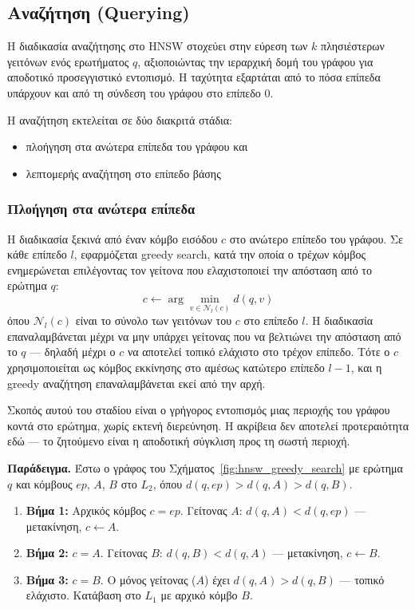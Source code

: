 \documentclass[12pt,a4paper]{article}
\begin{document}
\subsection{Αναζήτηση (Querying)}
Η διαδικασία αναζήτησης στο HNSW στοχεύει στην εύρεση των $k$ πλησιέστερων γειτόνων ενός ερωτήματος $q$, αξιοποιώντας την ιεραρχική δομή του γράφου για αποδοτικό προσεγγιστικό εντοπισμό. Η ταχύτητα εξαρτάται από το πόσα επίπεδα υπάρχουν και από τη σύνδεση του γράφου στο επίπεδο 0.

Η αναζήτηση εκτελείται σε δύο διακριτά στάδια:
\begin{itemize}
    \item πλοήγηση στα ανώτερα επίπεδα του γράφου και 
    \item λεπτομερής αναζήτηση στο επίπεδο βάσης
\end{itemize}

\subsubsection{Πλοήγηση στα ανώτερα επίπεδα}
Η διαδικασία ξεκινά από έναν κόμβο εισόδου $c$ στο ανώτερο επίπεδο του γράφου. Σε κάθε επίπεδο $l$, εφαρμόζεται greedy search, κατά την οποία ο τρέχων κόμβος ενημερώνεται επιλέγοντας τον γείτονα που ελαχιστοποιεί την απόσταση από το ερώτημα $q$:
\begin{equation}
    c \leftarrow \arg\min_{v \in \mathcal{N}_l(c)} d(q,v)
\end{equation}
όπου $\mathcal{N}_l(c)$ είναι το σύνολο των γειτόνων του $c$ στο επίπεδο $l$. Η διαδικασία επαναλαμβάνεται μέχρι να μην υπάρχει γείτονας που να βελτιώνει την απόσταση από το $q$ --- δηλαδή μέχρι ο $c$ να αποτελεί τοπικό ελάχιστο στο τρέχον επίπεδο. Τότε ο $c$ χρησιμοποιείται ως κόμβος εκκίνησης στο αμέσως κατώτερο επίπεδο $l-1$, και η greedy αναζήτηση επαναλαμβάνεται εκεί από την αρχή.

Σκοπός αυτού του σταδίου είναι ο γρήγορος εντοπισμός μιας περιοχής του γράφου κοντά στο ερώτημα, χωρίς εκτενή διερεύνηση. Η ακρίβεια δεν αποτελεί προτεραιότητα εδώ --- το ζητούμενο είναι η αποδοτική σύγκλιση προς τη σωστή περιοχή.

\medskip
\textbf{Παράδειγμα.} Έστω ο γράφος του Σχήματος~\ref{fig:hnsw_greedy_search} με ερώτημα $q$ και κόμβους $ep$, $A$, $B$ στο $L_2$, όπου $d(q,ep) > d(q,A) > d(q,B)$.
\begin{enumerate}
    \item \textbf{Βήμα 1:} Αρχικός κόμβος $c = ep$. Γείτονας $A$: $d(q,A) < d(q,ep)$ --- μετακίνηση, $c \leftarrow A$.
    \item \textbf{Βήμα 2:} $c = A$. Γείτονας $B$: $d(q,B) < d(q,A)$ --- μετακίνηση, $c \leftarrow B$.
    \item \textbf{Βήμα 3:} $c = B$. Ο μόνος γείτονας ($A$) έχει $d(q,A) > d(q,B)$ --- τοπικό ελάχιστο. Κατάβαση στο $L_1$ με αρχικό κόμβο $B$.
\end{enumerate}
\end{document}
